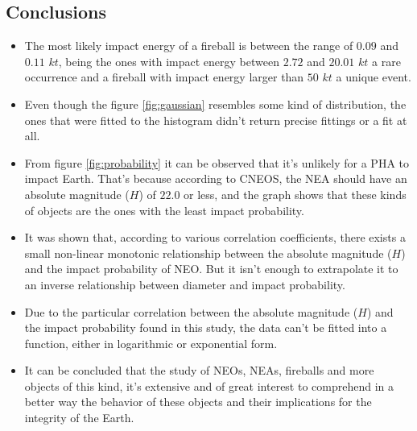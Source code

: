 \documentclass[a1,portrait]{a1poster}
\begin{document}
\begin{multicols}{2}
\color{DarkOliveGreen} %

\section*{Conclusions}

\begin{itemize}
    \item The most likely impact energy of a fireball is between the range of $0.09$ and $0.11$ $kt$,
	being the ones with impact energy between $2.72$ and $20.01$ $kt$ a rare occurrence and
	a fireball with impact energy larger than $50$ $kt$ a unique event.
	\item Even though the figure \ref{fig:gaussian} resembles some kind of distribution, the ones that
	were fitted to the histogram didn't return precise fittings or a fit at all.
	\item From figure \ref{fig:probability} it can be observed that it's unlikely for a PHA to impact
	Earth. That's because according to CNEOS, the NEA should have an absolute magnitude ($H$) of $22.0$
	or less, and the graph shows that these kinds of objects are the ones with the least impact probability.
	\item It was shown that, according to various correlation coefficients, there exists a small non-linear
	monotonic relationship between the absolute magnitude ($H$) and the impact probability of NEO. But
	it isn't enough to extrapolate it to an inverse relationship between diameter and impact probability.
	\item Due to the particular correlation between the absolute magnitude ($H$) and the impact probability
	found in this study, the data can't be fitted into a function, either in logarithmic or exponential form.
	\item It can be concluded that the study of NEOs, NEAs, fireballs and more objects of this kind, it's
	extensive and of great interest to comprehend in a better way the behavior of these objects and their
	implications for the integrity of the Earth.
\end{itemize}

\color{Black} %



\end{multicols}
\end{document}
